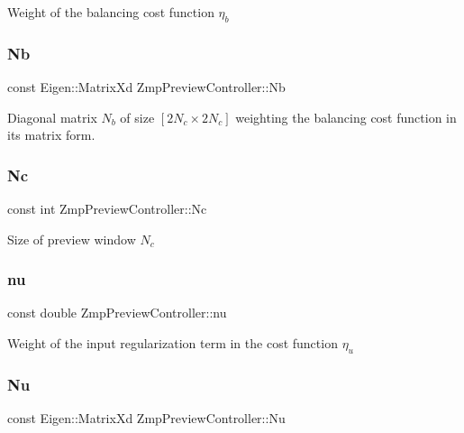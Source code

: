 Weight of the balancing cost function $ \eta_b $ \hypertarget{classZmpPreviewController_abd345d397e99ae01ad4ea80cd9894802}{}\label{classZmpPreviewController_abd345d397e99ae01ad4ea80cd9894802} 
\subsubsection{\texorpdfstring{Nb}{Nb}}
{\footnotesize\ttfamily const Eigen\+::\+Matrix\+Xd Zmp\+Preview\+Controller\+::\+Nb\hspace{0.3cm}{\ttfamily [private]}}

Diagonal matrix $N_b$ of size $[2N_c \times 2N_c]$ weighting the balancing cost function in its matrix form. \hypertarget{classZmpPreviewController_af0c8b4aa92a6e3e95f80d81a8c91f693}{}\label{classZmpPreviewController_af0c8b4aa92a6e3e95f80d81a8c91f693} 
\subsubsection{\texorpdfstring{Nc}{Nc}}
{\footnotesize\ttfamily const int Zmp\+Preview\+Controller\+::\+Nc\hspace{0.3cm}{\ttfamily [private]}}

Size of preview window $ N_c $ \hypertarget{classZmpPreviewController_ac611f084023404faba1ccfab573cd81d}{}\label{classZmpPreviewController_ac611f084023404faba1ccfab573cd81d} 
\subsubsection{\texorpdfstring{nu}{nu}}
{\footnotesize\ttfamily const double Zmp\+Preview\+Controller\+::nu\hspace{0.3cm}{\ttfamily [private]}}

Weight of the input regularization term in the cost function $\eta_u$ \hypertarget{classZmpPreviewController_ac3e92145988993ede7ce2060b997c8db}{}\label{classZmpPreviewController_ac3e92145988993ede7ce2060b997c8db} 
\subsubsection{\texorpdfstring{Nu}{Nu}}
{\footnotesize\ttfamily const Eigen\+::\+Matrix\+Xd Zmp\+Preview\+Controller\+::\+Nu\hspace{0.3cm}{\ttfamily [private]}}

